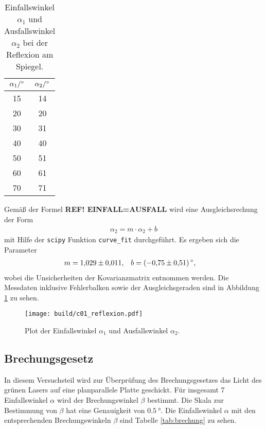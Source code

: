 \begin{table}[H]
    \centering
    \caption[short]{Einfallswinkel $\alpha_1$ und Ausfallswinkel $\alpha_2$ bei der Reflexion am Spiegel.}
    \label{tab:reflexion}
    \begin{tabular}{S S}
        \toprule
        {$\alpha_1 / \unit[]{\degree}$} & {$\alpha_2 / \unit[]{\degree}$} \\
        \midrule
        15 & 14 \\
        20 & 20 \\
        30 & 31 \\
        40 & 40 \\
        50 & 51 \\
        60 & 61 \\
        70 & 71 \\
        \bottomrule
    \end{tabular}
\end{table}

\noindent
Gemäß der Formel \textbf{REF! EINFALL=AUSFALL} wird eine Ausgleichsrechung der Form
\begin{align}
    \alpha_2 = m \cdot \alpha_2 + b
\end{align}
mit Hilfe der \texttt{scipy} \cite[]{scipy} Funktion \texttt{curve\_fit} durchgeführt.
Es ergeben sich die Parameter
\begin{align}
    m &= \num[]{1.029 +- 0.011}, & b &= (\num[]{-0.75 +- 0.51}) \, \unit[]{\degree},
\end{align}
wobei die Unsicherheiten der Kovarianzmatrix entnommen werden.
Die Messdaten inklusive Fehlerbalken sowie der Ausgleichsgeraden sind in Abbildung \ref{fig:reflexion} zu sehen.

\begin{figure}[H]
    \centering
    \texttt{[image: build/c01\_reflexion.pdf]}
    \caption[]{Plot der Einfallswinkel $\alpha_1$ und Ausfallswinkel $\alpha_2$.}
    \label{fig:reflexion}
\end{figure}






\subsection{Brechungsgesetz}
In diesem Versuchsteil wird zur Überprüfung des Brechungsgesetzes das Licht des grünen Lasers auf eine planparallele Platte geschickt.
Für insgesamt 7 Einfallswinkel $\alpha$ wird der Brechungswinkel $\beta$ bestimmt.
Die Skala zur Bestimmung von $\beta$ hat eine Genauigkeit von $\qty[]{0.5}{\degree}$.
Die Einfallswinkel $\alpha$ mit den entsprechenden Brechungswinkeln $\beta$ sind Tabelle \ref{tab:brechung} zu sehen.

